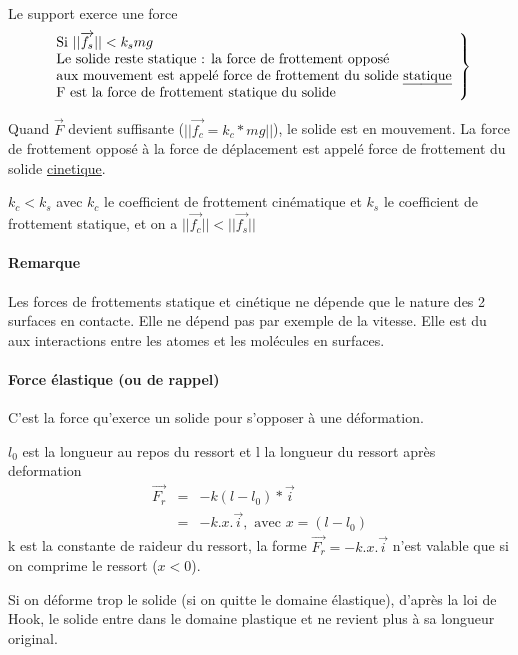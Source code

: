 Le support exerce une force \[
	\left.
	\begin{array}{l}
		\text{Si } ||\overrightarrow{f_s}|| < k_smg\\
	\text{Le solide reste statique : la force de frottement opposé} \\
	\text{aux mouvement est appelé force de frottement du solide \ul{statique}}\\
	\text{F est la force de frottement statique du solide}
	\end{array}
	\right\}
\]

Quand $\vec{F}$ devient suffisante ($||\overrightarrow{f_c} = k_c*mg||$), le solide est en mouvement. La force de frottement opposé à la force de déplacement est appelé force de frottement du solide \ul{cinetique}.

$k_c < k_s$ avec $k_c$ le coefficient de frottement cinématique et $k_s$ le coefficient de frottement statique, et on a $||\overrightarrow{f_c}|| < ||\overrightarrow{f_s}||$
\paragraph{Remarque} Les forces de frottements statique et cinétique ne dépende que le nature des 2 surfaces en contacte. Elle ne dépend pas par exemple de la vitesse.
Elle est du aux interactions entre les atomes et les molécules en surfaces.


\paragraph{Force élastique (ou de rappel)} C'est la force qu'exerce un solide pour s'opposer à une déformation.

\begin{wrapfigure}{r}{0pt}
\end{wrapfigure}
$l_0$ est la longueur au repos du ressort et l la longueur du ressort après deformation
\begin{align*}
	\overrightarrow{F_r} &=& -k(l-l_0)*\vec{i} \\
										&=& -k.x.\vec{i}, \text{ avec }x=(l-l_0)
\end{align*}
k est la constante de raideur du ressort, la forme $\vec{F_r} = -k.x.\vec{i}$ n'est valable que si on comprime le ressort ($x<0$).

Si on déforme trop le solide (si on quitte le domaine élastique), d'après la loi de Hook, le solide entre dans le domaine plastique et ne revient plus à sa longueur original.

